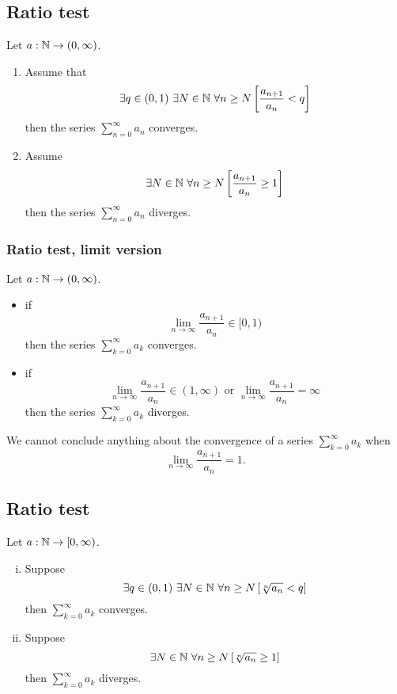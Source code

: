 \subsection{Ratio test}
\uthm Let $a : \mathbb{N} \to (0, \infty)$.
\begin{enumerate}
    \item Assume that \[\exists q \in (0,1)\ \exists N \in \N\ \forall n \geq N
        \left[ \frac{a_{n+1}}{a_n} < q \right]\] then the series
        $\sum_{n=0}^{\infty} a_n$ converges.
    \item Assume \[ \exists N \in \mathbb{N}\ \forall n \geq N \left[ 
        \frac{a_{n+1}}{a_n} \geq 1 \right] \] then the series
        $\sum_{n=0}^{\infty} a_n$ diverges.
\end{enumerate}

\subsubsection*{Ratio test, limit version}
\ucol Let $a : \mathbb{N} \to (0, \infty)$.
\begin{itemize}
    \item if \[
            \lim_{n \to \infty} \frac{a_{n+1}}{a_n} \in [0,1)
        \] then the series $\sum_{k=0}^{\infty} a_k$ converges.
    \item if \[
            \lim_{n \to \infty} \frac{a_{n+1}}{a_n} \in (1,\infty) \text{ or }
            \lim_{n \to \infty} \frac{a_{n+1}}{a_n} = \infty
        \] then the series $\sum_{k=0}^{\infty} a_k$ diverges.
\end{itemize}
\warning We cannot conclude anything about the convergence of a series
$\sum_{k=0}^{\infty} a_k$ when \[
            \lim_{n \to \infty} \frac{a_{n+1}}{a_n} = 1.
\]

\subsection{Ratio test}
\uthm Let $a : \mathbb{N} \to [0,\infty)$.
\begin{enumerate}[(i)]
    \item Suppose \[
            \exists q \in (0,1)\ \exists N \in \mathbb{N}\ \forall n \geq N \left[ 
            \sqrt[n]{a_n} < q \right]
        \] then $\sum_{k=0}^{\infty} a_k$ converges.
    \item Suppose \[
            \exists N \in \mathbb{N}\ \forall n \geq N \left[ 
            \sqrt[n]{a_n} \geq 1 \right]
        \] then $\sum_{k=0}^{\infty} a_k$ diverges.
\end{enumerate}

